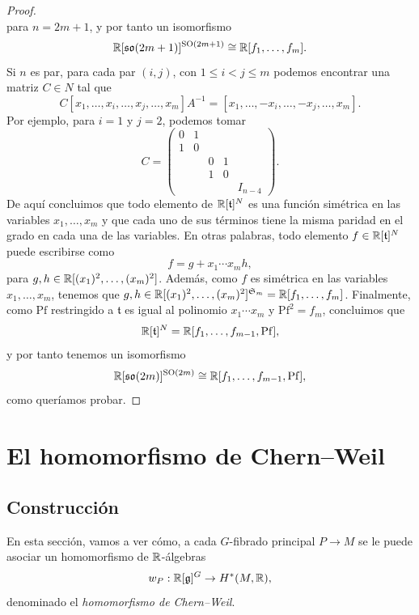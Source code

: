 \documentclass[11pt,a4paper]{amsbook}
\theoremstyle{remark} \newtheorem{rmk}[subsection]{Observación}
\theoremstyle{definition} \newtheorem{defn}[subsection]{Definición}
\theoremstyle{definition} \newtheorem{ex}[subsection]{Ejemplo}
\theoremstyle{definition} \newtheorem{ej}[subsection]{Ejercicio}
\begin{document}
\begin{proof}
\begin{equation*}
\end{equation*}
para $n=2m+1$, y por tanto un isomorfismo
\begin{equation*}
\mathbb R[\mathfrak{so}(2m+1)]^{\mathrm{SO}(2m+1)} \cong \mathbb R[f_1,\dots,f_m].
\end{equation*}
Si $n$ es par, para cada par $(i,j)$, con $1\leq i<j \leq m$ podemos encontrar una matriz $C\in N$ tal que
\begin{equation*}
C [x_1,\dots,x_i,\dots,x_j,\dots,x_m] A^{-1} = [x_1,\dots,-x_i,\dots,-x_j,\dots,x_m].
\end{equation*}
Por ejemplo, para $i=1$ y $j=2$, podemos tomar
\begin{equation*}
  C =
  \begin{pmatrix}
0 & 1 \\
1 & 0 \\
 &  & 0 & 1\\
 &  & 1 & 0\\
 &  &  &  & I_{n-4}
\end{pmatrix}.
\end{equation*}
De aquí concluimos que todo elemento de $\mathbb R[\mathfrak t]^N$ es una función simétrica en las variables $x_1,\dots,x_m$ y que cada uno de sus términos tiene la misma paridad en el grado en cada una de las variables. En otras palabras, todo elemento $f\in \mathbb R[\mathfrak t]^N$ puede escribirse como
\begin{equation*}
f = g + x_1\cdots x_m h,
\end{equation*}
para $g,h \in \mathbb R[(x_1)^2,\dots,(x_m)^2]$. Además, como $f$ es simétrica en las variables $x_1,\dots,x_m$, tenemos que $g,h\in \mathbb R[(x_1)^2,\dots,(x_m)^2]^{\mathfrak{S}_m}=\mathbb R[f_1,\dots,f_m]$. Finalmente, como $\mathrm{Pf}$ restringido a $\mathfrak{t}$ es igual al polinomio $x_1\cdots x_m$ y $\mathrm{Pf}^2=f_m$, concluimos que
\begin{equation*}
\mathbb R[\mathfrak t]^N = \mathbb R[f_1,\dots,f_{m-1},\mathrm{Pf}],
\end{equation*}
y por tanto tenemos un isomorfismo
\begin{equation*}
\mathbb R[\mathfrak{so}(2m)]^{\mathrm{SO}(2m)} \cong \mathbb R[f_1,\dots,f_{m-1},\mathrm{Pf}],
\end{equation*}
como queríamos probar.
\end{proof}

\section{El homomorfismo de Chern--Weil}
\subsection{Construcción} En esta sección, vamos a ver cómo, a cada $G$-fibrado principal $P\rightarrow M$ se le puede asociar un homomorfismo de $\mathbb R$-álgebras
\begin{equation*}
w_P: \mathbb R[\mathfrak{g}]^G \rightarrow H^*(M,\mathbb R),
\end{equation*}
denominado el \emph{homomorfismo de Chern--Weil}.
\end{document}
